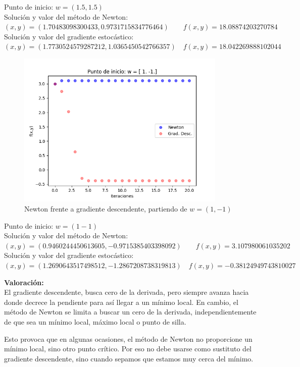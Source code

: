 \documentclass[a4]{article}
\begin{document}
Punto de inicio: $w=(1.5, 1.5)$ \\
Solución y valor del método de Newton: \\
$(x,y) = ( 1.70483098300433 ,  0.9731715834776464 ) \qquad
f(x,y) =  18.08874203270784$ \\
Solución y valor del gradiente estocástico: \\
$(x,y) = ( 1.7730524579287212 ,  1.0365450542766357 ) \quad
f(x,y) =  18.042269888102044$

\begin{figure}[H]
    \centering    
    \includegraphics[width=100mm]{imgs/newton-grad_4.png}
    \caption{Newton frente a gradiente descendente, partiendo de $w=(1,-1)$}
    \label{fig:newton-grad_4}
\end{figure}

Punto de inicio: $w=(1 -1)$ \\
Solución y valor del método de Newton: \\
$(x,y) = ( 0.9460244450613605 ,  -0.9715385403398092 ) \qquad
f(x,y) =  3.107980061035202$ \\
Solución y valor del gradiente estocástico: \\
$(x,y) = ( 1.2690643517498512 ,  -1.2867208738319813 ) \quad
f(x,y) =  -0.38124949743810027$

\newpage

\textbf{\Large Valoración:} \\

El gradiente descendente, busca cero de la derivada, pero siempre avanza
hacia donde decrece la pendiente para así llegar a un mínimo local.
En cambio, el método de Newton se limita a buscar un cero de la derivada, independientemente de que sea un
mínimo local, máximo local o punto de silla.

Esto provoca que en algunas ocasiones, el método de Newton no proporcione un
mínimo local, sino otro punto crítico. Por eso no debe usarse como sustituto
del gradiente descendente, sino cuando sepamos que estamos muy cerca del mínimo.
\end{document}
